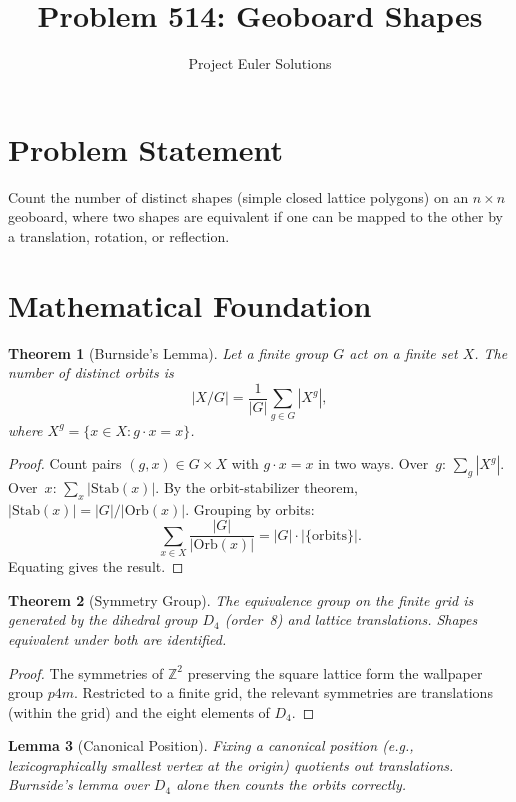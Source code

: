 \documentclass[11pt]{article}
\title{Problem 514: Geoboard Shapes}
\author{Project Euler Solutions}
\date{}
\newtheorem{theorem}{Theorem}
\newtheorem{lemma}[theorem]{Lemma}
\begin{document}
\maketitle

\section{Problem Statement}

Count the number of distinct shapes (simple closed lattice polygons) on an $n \times n$ geoboard, where two shapes are equivalent if one can be mapped to the other by a translation, rotation, or reflection.

\section{Mathematical Foundation}

\begin{theorem}[Burnside's Lemma]
Let a finite group $G$ act on a finite set $X$. The number of distinct orbits is
\[
|X/G| = \frac{1}{|G|}\sum_{g \in G}|X^g|,
\]
where $X^g = \{x \in X : g \cdot x = x\}$.
\end{theorem}

\begin{proof}
Count pairs $(g,x) \in G \times X$ with $g \cdot x = x$ in two ways. Over~$g$: $\sum_g |X^g|$. Over~$x$: $\sum_x |\mathrm{Stab}(x)|$. By the orbit-stabilizer theorem, $|\mathrm{Stab}(x)| = |G|/|\mathrm{Orb}(x)|$. Grouping by orbits:
\[
\sum_{x \in X}\frac{|G|}{|\mathrm{Orb}(x)|} = |G| \cdot |\{\text{orbits}\}|.
\]
Equating gives the result.
\end{proof}

\begin{theorem}[Symmetry Group]
The equivalence group on the finite grid is generated by the dihedral group $D_4$ (order~8) and lattice translations. Shapes equivalent under both are identified.
\end{theorem}

\begin{proof}
The symmetries of $\mathbb{Z}^2$ preserving the square lattice form the wallpaper group $p4m$. Restricted to a finite grid, the relevant symmetries are translations (within the grid) and the eight elements of $D_4$.
\end{proof}

\begin{lemma}[Canonical Position]
Fixing a canonical position (e.g., lexicographically smallest vertex at the origin) quotients out translations. Burnside's lemma over $D_4$ alone then counts the orbits correctly.
\end{lemma}
\end{document}
